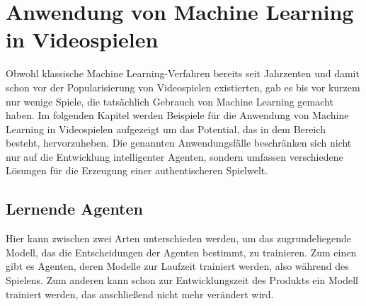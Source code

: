 \chapter{Anwendung von Machine Learning in Videospielen}\label{ml_games_beispiele}
Obwohl klassische Machine Learning-Verfahren bereits seit Jahrzenten und damit schon vor der Popularisierung von Videospielen existierten, gab es bis vor kurzem nur wenige Spiele, die tatsächlich Gebrauch von Machine Learning gemacht haben. Im folgenden Kapitel werden Beispiele für die Anwendung von Machine Learning in Videospielen aufgezeigt um das Potential, das in dem Bereich besteht, hervorzuheben. Die genannten Anwendungsfälle beschränken sich nicht nur auf die Entwicklung intelligenter Agenten, sondern umfassen verschiedene Lösungen für die Erzeugung einer authentischeren Spielwelt.


\section{Lernende Agenten}
Hier kann zwischen zwei Arten unterschieden werden, um das zugrundeliegende Modell, das die Entscheidungen der Agenten bestimmt, zu trainieren.
Zum einen gibt es Agenten, deren Modelle zur Laufzeit trainiert werden, also während des Spielens. Zum anderen kann schon zur Entwicklungszeit des Produkts ein Modell trainiert werden, das anschließend nicht mehr verändert wird.



